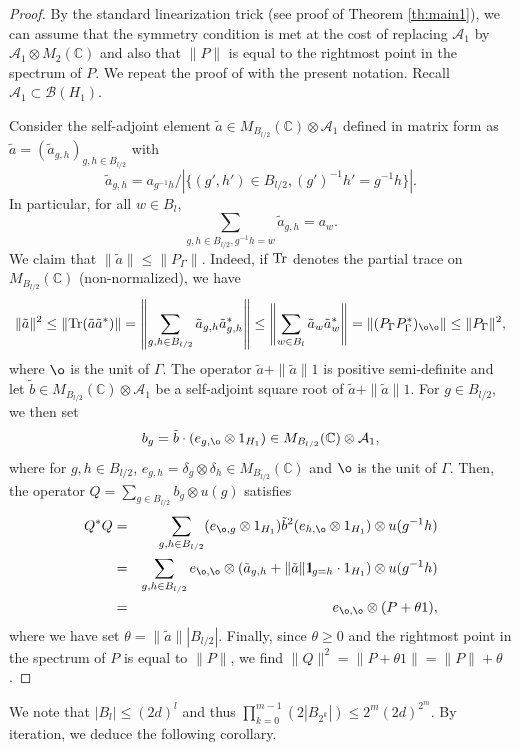 \documentclass[11pt]{article}
\newcommand{\cA}{\mathcal{A}}
\newcommand{\Tr}{{\rm Tr}}
\newcommand{\dC}{\mathbb {C}}
\newcommand{\cB}{\mathcal{B}}
\newcommand{\NRM}[1]{{{\left\| #1\right\|}}} %
\newcommand{\1}{1\!\!{\sf I}}
\newcommand{\IND}{\1}
\begin{document}
\begin{proof} By the standard linearization trick (see proof of Theorem \ref{th:main1}), we can assume that the symmetry condition is met at the cost of replacing $\cA_1$ by $\cA_1 \otimes M_2 (\dC)$ and also that $\|P \|$ is equal to the rightmost point in the spectrum of $P$. We repeat the proof of  \cite[Lemma 29]{BC2} with the present notation. Recall $\cA_1 \subset \cB(H_1)$.

Consider the self-adjoint element $\tilde a \in  M_{B_{l/2}} (\dC) \otimes \cA_1$ defined in matrix form as 
$
\tilde a = (\tilde a_{g,h})_{g,h \in B_{l/2}}
$
with 
$$
\tilde a_{g,h} = a_{g^{-1} h} / |\{(g',h')\in B_{l/2}, (g')^{-1}h'=g^{-1} h\}|.
$$
In particular, for all $w \in B_l$, $$\sum_{g,h\in B_{l/2}, g^{-1} h=w}\tilde a_{g,h}=a_w.$$ 
We claim that $\| \tilde a \| \leq \| P_\Gamma \|$. Indeed, if $\Tr$ denotes the partial trace on $M_{B_{l/2}} (\dC)$ (non-normalized), we have 
$$
 \| \tilde a \|^2 \leq \| \Tr  ( \tilde a \tilde a^*  ) \|  = \NRM{\sum_{g,h \in B_{l/2}} \tilde a_{g,h} \tilde a_{g,h}^*  } \leq \NRM{\sum_{w \in B_{l}}  \tilde a_{w} \tilde a_{w}^*  } = \NRM{ (P_\Gamma P_\Gamma ^*)_{\o \o} } \leq \| P_\Gamma \|^2,
$$ 
where $\o$ is the unit of $\Gamma$. The operator $\tilde a + \| \tilde a \| 1$ is positive semi-definite and let
 $\tilde b \in M_{B_{l/2}} (\dC) \otimes \cA_1$ be a self-adjoint square root of $\tilde a + \| \tilde a \| 1$.
For $g \in B_{l/2}$,  we then set $$b_g = \tilde b \cdot ( e_{g,\o} \otimes 1_{H_1})   \in M_{B_{l/2}} (\dC) \otimes \cA_1,$$ where for $g,h \in B_{l/2}$, $e_{g,h}  = \delta_g \otimes \delta_h \in M_{B_{l/2}} (\dC) $ and $\o$ is the unit of $\Gamma$.  Then, the operator $Q=\sum_{g\in B_{l/2}} b_g\otimes u(g)$ satisfies
\begin{eqnarray*}  Q^*   Q & = &\sum_{g,h  \in B_{l/2}}   (e_{\o,g} \otimes 1_{H_1}) \tilde b ^2 ( e_{h,\o} \otimes 1_{H_1}) \otimes u(g^{-1} h) \\
 &= & \sum_{g,h  \in B_{l/2}} e_{\o,\o} \otimes ( \tilde a_{g,h} + \| \tilde a \| \IND_{g = h} \cdot 1_{H_1}) \otimes u(g^{-1} h)  \\
 &=& e_{\o,\o} \otimes (P + \theta 1),
\end{eqnarray*}
  where we have set $\theta =\| \tilde a \| |B_{l/2}|$.
Finally, since $\theta \geq 0$ and the rightmost point in the spectrum of $P$ is equal to $\|P\|$, we find 
$
\| Q\|^2 = \| P + \theta  1\| = \|P \| + \theta
$. 
 \end{proof}

We note that $|B_l| \leq (2d)^l$ and thus $\prod_{k=0}^{m-1} (  2 |B_{2^k}|) \leq 2^{m} (2d)^{2^m}$. 
By iteration, we deduce the following corollary. 
\end{document}
